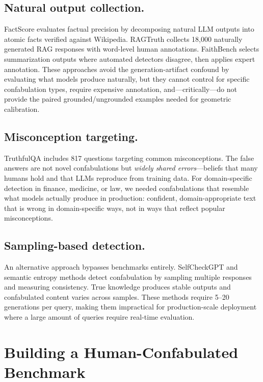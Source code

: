 \documentclass[11pt]{article}
\begin{document}
\subsection{Natural output collection.}
FactScore \citep{min2023factscore} evaluates factual precision by decomposing natural LLM outputs into atomic facts verified against Wikipedia.
RAGTruth \citep{niu2024ragtruth} collects 18{,}000 naturally generated RAG responses with word-level human annotations.
FaithBench \citep{bao2025faithbench} selects summarization outputs where automated detectors disagree, then applies expert annotation.
These approaches avoid the generation-artifact confound by evaluating what models produce naturally, but they cannot control for specific confabulation types, require expensive annotation, and---critically---do not provide the paired grounded/ungrounded examples needed for geometric calibration.

\subsection{Misconception targeting.}
TruthfulQA \citep{lin2022truthfulqa} includes 817 questions targeting common misconceptions. The false answers are not novel confabulations but \emph{widely shared errors}---beliefs that many humans hold and that LLMs reproduce from training data.
For domain-specific detection in finance, medicine, or law, we needed confabulations that resemble what models actually produce in production: confident, domain-appropriate text that is wrong in domain-specific ways, not in ways that reflect popular misconceptions.

\subsection{Sampling-based detection.}
An alternative approach bypasses benchmarks entirely.
SelfCheckGPT \citep{manakul2023selfcheckgpt} and semantic entropy methods \citep{kuhn2023semantic, farquhar2024detecting} detect confabulation by sampling multiple responses and measuring consistency. True knowledge produces stable outputs and confabulated content varies across samples.
These methods require 5--20 generations per query, making them impractical for production-scale deployment where a large amount of queries require real-time evaluation.

\section{Building a Human-Confabulated Benchmark}
\label{sec:construction}
\end{document}
